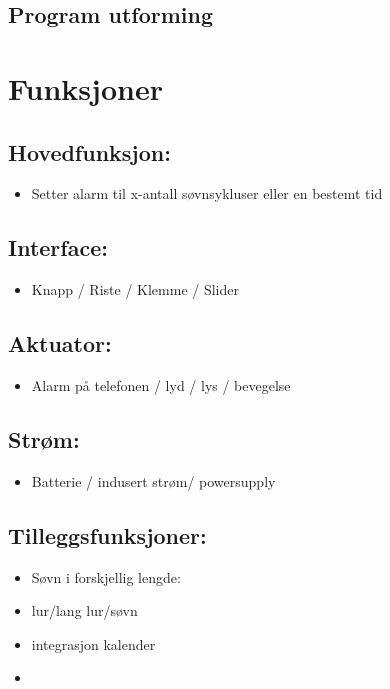 \documentclass[12pt, a4paper]{article}
\begin{document}
\subsection*{Program utforming}


\section{Funksjoner}

\subsection {Hovedfunksjon:}
\begin{itemize}
    \item Setter alarm til x-antall søvnsykluser eller en bestemt tid
\end{itemize}


\subsection {Interface: }
\begin{itemize}
    \item Knapp / Riste / Klemme / Slider
\end{itemize}


\subsection {Aktuator:}
\begin{itemize}
    \item Alarm på telefonen / lyd / lys / bevegelse
\end{itemize}


\subsection {Strøm: }
\begin{itemize}
    \item Batterie / indusert strøm/ powersupply
\end{itemize}



\subsection {Tilleggsfunksjoner: }
\begin{itemize}
    \item Søvn i forskjellig lengde: 
    \item lur/lang lur/søvn
    \item integrasjon kalender
    \item 
\end{itemize}
\end{document}
